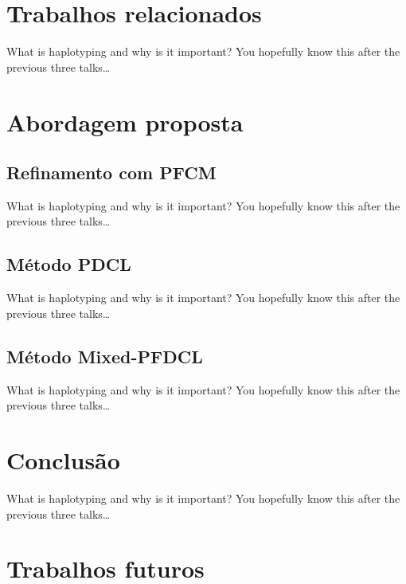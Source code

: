\documentclass{beamer}
\begin{document}
\section{Trabalhos relacionados}

\begin{frame}{What is haplotyping and why is it important?}
  You hopefully know this after the previous three talks\dots
\end{frame}

\section{Abordagem proposta}

\subsection{Refinamento com PFCM}
\begin{frame}{What is haplotyping and why is it important?}
  You hopefully know this after the previous three talks\dots
\end{frame}
\subsection{Método PDCL}
\begin{frame}{What is haplotyping and why is it important?}
  You hopefully know this after the previous three talks\dots
\end{frame}
\subsection{Método Mixed-PFDCL}
\begin{frame}{What is haplotyping and why is it important?}
  You hopefully know this after the previous three talks\dots
\end{frame}

\section{Conclusão}

\begin{frame}{What is haplotyping and why is it important?}
  You hopefully know this after the previous three talks\dots
\end{frame}

\section{Trabalhos futuros}
\end{document}
